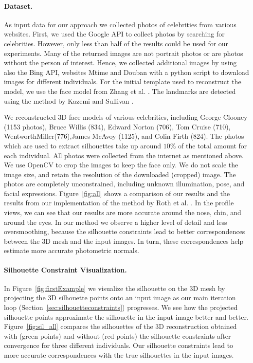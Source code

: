 \paragraph*{Dataset.} As input data for our approach we collected photos of celebrities from various websites. First, we used the Google API to collect photos by searching for celebrities. However, only less than half of the results could be used for our experiments. Many of the returned images are not portrait photos or are photos without the person of interest. Hence, we collected additional images by using also the Bing API, websites Mtime and Douban with a python script to download images for different individuals. For the initial template used to reconstruct the model, we use the face model from Zhang et al. \cite{Zhang04}. The landmarks are detected using the method by Kazemi and Sullivan \cite{kazemi2014one}.

We reconstructed 3D face models of various celebrities, including George Clooney (1153 photos),  Bruce Willis (834), Edward Norton (706), Tom Cruise (710), WentworthMiller(776),James McAvoy (1125), and Colin Firth (824). The photos which are used to extract silhouettes take up around $10\%$ of the total amount for each individual. All photos were collected from the internet as mentioned above. We use OpenCV to crop the images to keep the face only. We do not scale the image size, and retain the resolution of the downloaded (cropped) image. The photos are completely unconstrained, including unknown illumination, pose, and facial expressions. Figure~\ref{fig:all} shows a comparison of our results and the results from our implementation of the method by Roth et al. \cite{Roth:2015:UFR}. In the profile views, we can see that our results are more accurate around the nose, chin, and around the eyes. In our method we observe a higher level of detail and less oversmoothing, because the silhouette constraints lead to better correspondences between the 3D mesh and the input images. In turn, these correspondences help estimate more accurate photometric normals.

\paragraph*{Silhouette Constraint Visualization.} In Figure~\ref{fig:firstExample} we visualize the silhouette on the 3D mesh by projecting the 3D silhouette points onto an input image as our main iteration loop (Section~\ref{sec:silhouetteconstraints}) progresses. We see how the projected silhouette points approximate the silhouette in the input image better and better. Figure~\ref{fig:sil_all} compares the silhouettes of the 3D reconstruction obtained with (green points) and without (red points) the silhouette constraints after convergence for three different individuals. Our silhouette constraints lead to more accurate correspondences with the true silhouettes in the input images. 


